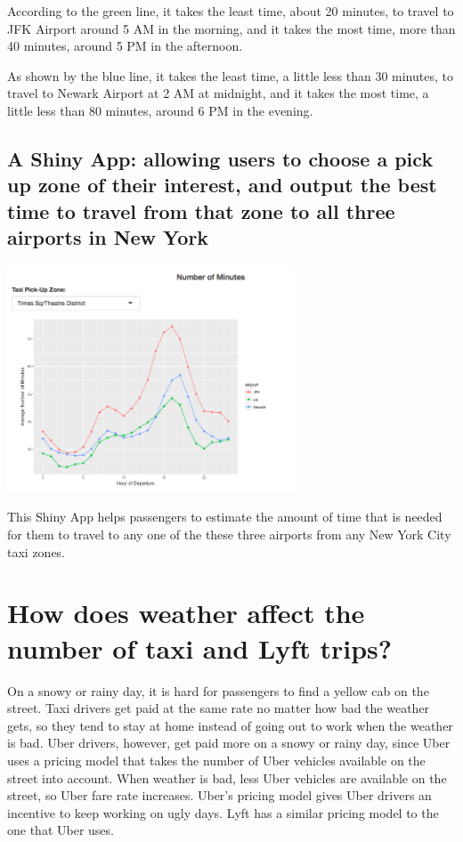 \documentclass[12pt,twoside]{reedthesis}
\theoremstyle{definition}
\theoremstyle{definition}
\theoremstyle{definition}
\theoremstyle{remark}
\begin{document}
According to the green line, it takes the least time, about 20 minutes,
to travel to JFK Airport around 5 AM in the morning, and it takes the
most time, more than 40 minutes, around 5 PM in the afternoon.

As shown by the blue line, it takes the least time, a little less than
30 minutes, to travel to Newark Airport at 2 AM at midnight, and it
takes the most time, a little less than 80 minutes, around 6 PM in the
evening.

\subsection{A Shiny App: allowing users to choose a pick up zone of
their interest, and output the best time to travel from that zone to all
three airports in New
York}\label{a-shiny-app-allowing-users-to-choose-a-pick-up-zone-of-their-interest-and-output-the-best-time-to-travel-from-that-zone-to-all-three-airports-in-new-york}
\begin{center}\includegraphics[width=3.37in]{figure/shinyapp} \end{center}

This Shiny App helps passengers to estimate the amount of time that is
needed for them to travel to any one of the these three airports from
any New York City taxi zones.

\section{How does weather affect the number of taxi and Lyft
trips?}\label{how-does-weather-affect-the-number-of-taxi-and-lyft-trips}

On a snowy or rainy day, it is hard for passengers to find a yellow cab
on the street. Taxi drivers get paid at the same rate no matter how bad
the weather gets, so they tend to stay at home instead of going out to
work when the weather is bad. Uber drivers, however, get paid more on a
snowy or rainy day, since Uber uses a pricing model that takes the
number of Uber vehicles available on the street into account. When
weather is bad, less Uber vehicles are available on the street, so Uber
fare rate increases. Uber's pricing model gives Uber drivers an
incentive to keep working on ugly days. Lyft has a similar pricing model
to the one that Uber uses.
\end{document}
